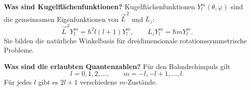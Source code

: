 \begin{answerbox}
\textbf{Was sind Kugelflächenfunktionen?}
Kugelflächenfunktionen \(Y_l^m(\theta,\varphi)\) sind die gemeinsamen Eigenfunktionen von \(\vec L^{\,2}\) und \(L_z\):
\[
    \vec L^{\,2}Y_l^m=\hbar^2l(l+1)Y_l^m,
    \qquad
    L_zY_l^m=\hbar mY_l^m.
\]
Sie bilden die natürliche Winkelbasis für dreidimensionale rotationssymmetrische Probleme.
\end{answerbox}

\begin{answerbox}
\textbf{Was sind die erlaubten Quantenzahlen?}
Für den Bahndrehimpuls gilt
\[
    l=0,1,2,\dots,
    \qquad
    m=-l,-l+1,\dots,l.
\]
Für jedes \(l\) gibt es \(2l+1\) verschiedene \(m\)-Zustände.
\end{answerbox}
